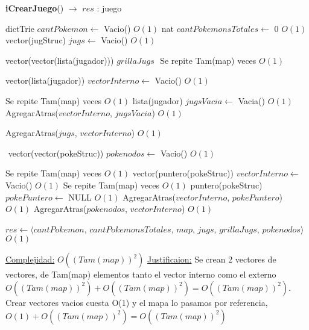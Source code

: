 \begin{Algoritmos}


\begin{algorithm}[H]
{\textbf{iCrearJuego}() $\to$ $res$ : juego}
\begin{algorithmic}[1]

\State dictTrie $cantPokemon \gets $ Vacio()  \Comment $O(1)$
\State nat $cantPokemonsTotales \gets $ 0  \Comment $O(1)$
$ $\newline
\State vector(jugStruc)  $jugs \gets$ Vacio()     \Comment $O(1)$

\State vector(vector(lista(jugador)))   $grillaJugs$
$ $\newline
{} \Comment Se repite Tam(map) veces $O(1)$
    
    \State vector(lista(jugador)) $vectorInterno \gets$ Vacio()  \Comment $O(1)$
    
      \Comment Se repite Tam(map) veces $O(1)$
        \State lista(jugador) $jugsVacia \gets$ Vacia()   \Comment $O(1)$
        \State AgregarAtras($vectorInterno$, $jugsVacia$) \Comment $O(1)$    
    \EndFor
    
    AgregarAtras($jugs$, $vectorInterno$)   \Comment $O(1)$

\EndFor
$ $\newline
\State vector(vector(pokeStruc))  $pokenodos \gets$ Vacio()  \Comment $O(1)$

       \Comment Se repite Tam(map) veces $O(1)$
    \State vector(puntero(pokeStruc)) $vectorInterno \gets$ Vacio()  \Comment $O(1)$
        \Comment Se repite Tam(map) veces $O(1)$
        \State puntero(pokeStruc) $pokePuntero \gets$ NULL   \Comment $O(1)$
        \State AgregarAtras($vectorInterno$, $pokePuntero$) \Comment $O(1)$
    \EndFor
    AgregarAtras($pokenodos$, $vectorInterno$)   \Comment $O(1)$
\EndFor

\State $res \gets \langle cantPokemon$, $cantPokemonsTotales$, $map$, $jugs$, $grillaJugs$, $pokenodos \rangle$   \Comment $O(1)$

\medskip
\Statex \underline{Complejidad:} $O((Tam(map))^2)$
\Statex \underline{Justificaion:} Se crean 2 vectores de vectores, de Tam(map) elementos tanto el vector interno como el externo $O((Tam(map))^2) + O((Tam(map))^2) = O((Tam(map))^2)$. Crear vectores vacios cuesta O(1) y el mapa lo pasamos por referencia, $O(1) + O((Tam(map))^2) = O((Tam(map))^2)$


\end{algorithmic}
\end{algorithm}
\end{Algoritmos}
